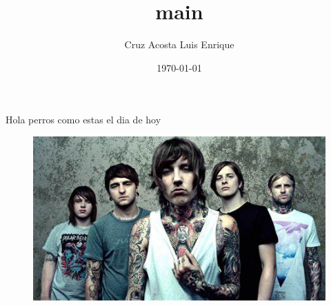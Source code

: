 \documentclass{article}
\title{main}
\author{Cruz Acosta Luis Enrique}
\date{\today}
\begin{document}
 
\maketitle
 
Hola perros como estas el dia de hoy 

\bigskip

\begin{figure}[h!]
    \centering
    \includegraphics[scale=0.5]{img/OIP.jpg}
\end{figure}
 
\end{document}
